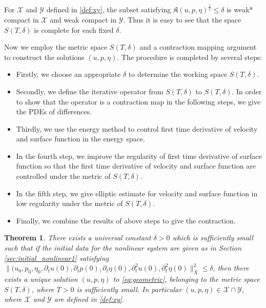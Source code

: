 \documentclass[letterpaper,reqno,10pt,twoside]{amsart}
\newtheorem{theorem}{Theorem}[section]
\theoremstyle{definition}
\theoremstyle{remark}
\def\p{\partial}
\begin{document}
		For $\mathcal{X}$ and $\mathcal{Y}$ defined in \eqref{def:xy}, the subset satisfying $\mathfrak{K}(u,p,\eta)^{\frac{1}{2}}\leq \delta$ is weak* compact in $\mathcal{X}$ and weak compact in $\mathcal{Y}$. Thus it is easy to see that the space $S(T, \delta)$ is complete for each fixed $\delta$. 
		
		Now we employ the metric space $S(T,\delta)$ and a contraction mapping argument to construct the solutions $(u, p, \eta)$. The procedure is completed by several steps: 
		\begin{itemize}
			\item 
			Firstly, we choose an appropriate $\delta$ to determine the working space $S(T, \delta)$.
			\item 
			Secondly, we define the iterative operator from $S(T, \delta)$ to $S(T, \delta)$. In order to show that the operator is a contraction map in the following steps, we give the PDEs of differences. 
			\item 
			Thirdly, we use the energy method to control first time derivative of velocity and surface function in the energy space. 
			\item 
			In the fourth step, we improve the regularity of first time derivative of surface function so that the first time derivative of velocity and surface function are controlled under the metric of $S(T, \delta)$. 
			\item 
			In the fifth step, we give elliptic estimate for velocity and surface function in low regularity under the metric of $S(T, \delta)$. 
			\item 
			Finally, we combine the results of above steps to give the contraction.
		\end{itemize}
		
		\begin{theorem}\label{thm: fixed point}
			There exists a universal constant $\delta>0$ which is sufficiently small such that if the initial data for the nonlinear system are given as in Section \ref{sec:initial_nonlinear1} satisfying
			$\|(u_0, p_0, \eta_0, \p_tu(0), \p_tp(0), \p_t\eta(0), \p_t^2u(0), \p_t^2\eta(0)\|_{X}^2\le \delta$,
			then there exists a unique solution $(u, p, \eta)$ to \eqref{eq:geometric}, belonging to the metric space $S(T, \delta)$, where $T>0$ is sufficiently small.  In particular $(u, p, \eta)\in \mathcal{X}\cap\mathcal{Y}$, where $\mathcal{X}$ and $\mathcal{Y}$ are defined in \eqref{def:xy}.
		\end{theorem}
		
\end{document}
